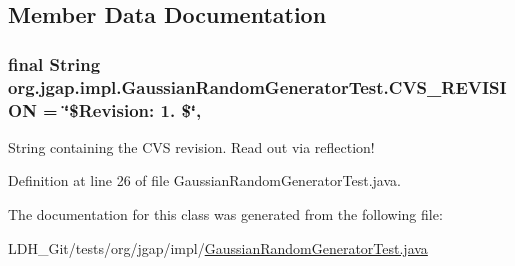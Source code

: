 \subsection{Member Data Documentation}
\hypertarget{classorg_1_1jgap_1_1impl_1_1_gaussian_random_generator_test_a2b330a47902c49e5fb69a44ad516bbf1}{
\subsubsection[{C\-V\-S\-\_\-\-R\-E\-V\-I\-S\-I\-O\-N}]{\setlength{\rightskip}{0pt plus 5cm}final String org.\-jgap.\-impl.\-Gaussian\-Random\-Generator\-Test.\-C\-V\-S\-\_\-\-R\-E\-V\-I\-S\-I\-O\-N = \char`\"{}\$Revision\-: 1. \$\char`\"{}\hspace{0.3cm}{\ttfamily [static]}, {\ttfamily [private]}}}\label{classorg_1_1jgap_1_1impl_1_1_gaussian_random_generator_test_a2b330a47902c49e5fb69a44ad516bbf1}
String containing the C\-V\-S revision. Read out via reflection! 

Definition at line 26 of file Gaussian\-Random\-Generator\-Test.\-java.



The documentation for this class was generated from the following file\-:\begin{DoxyCompactItemize}
\item 
L\-D\-H\-\_\-\-Git/tests/org/jgap/impl/\hyperlink{_gaussian_random_generator_test_8java}{Gaussian\-Random\-Generator\-Test.\-java}\end{DoxyCompactItemize}
